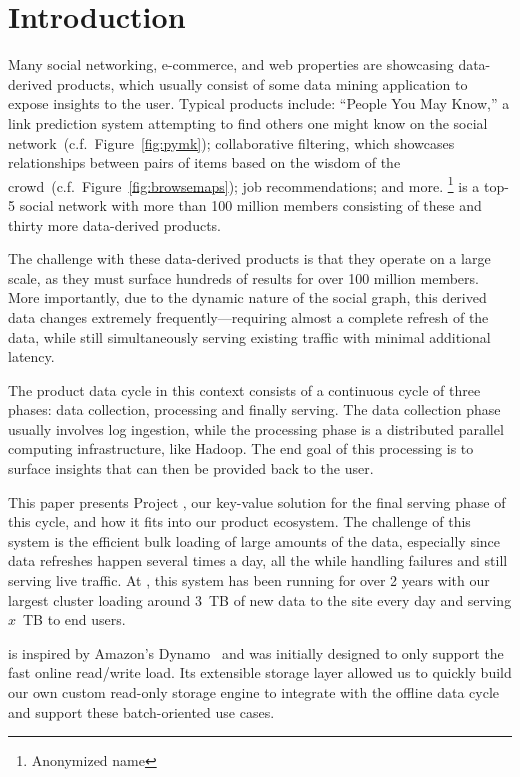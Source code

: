 \section{Introduction}
\label{sec:introduction}

Many social networking, e-commerce, and web properties are showcasing
data-derived products, which usually consist of some data mining
application to expose insights to the user. Typical products include:
``People You May Know,'' a link prediction system attempting to find
others one might know on the social
network~(c.f.~Figure~\ref{fig:pymk}); collaborative filtering, which
showcases relationships between pairs of items based on the wisdom of
the crowd~(c.f.~Figure~\ref{fig:browsemaps}); job recommendations; and
more. \linkedin\footnote{Anonymized name} is a top-5 social network
with more than 100 million members consisting of these and thirty more
data-derived products. 

The challenge with these data-derived products is that they operate on
a large scale, as they must surface hundreds of results for over 100
million members. More importantly, due to the dynamic nature of the
social graph, this derived data changes extremely
frequently---requiring almost a complete refresh of the data, while
still simultaneously serving existing traffic with minimal additional
latency.

The product data cycle in this context consists of a continuous cycle
of three phases: data collection, processing and finally serving. The
data collection phase usually involves log ingestion, while the
processing phase is a distributed parallel computing infrastructure,
like Hadoop. The end goal of this processing is to surface insights
that can then be provided back to the user. 

This paper presents Project \projectname{}, our key-value solution for
the final serving phase of this cycle, and how it fits into our
product ecosystem. The challenge of this system is the efficient bulk
loading of large amounts of the data, especially since data refreshes
happen several times a day, all the while handling failures and still
serving live traffic. At \linkedin, this system has been running for
over 2 years with our largest cluster loading around 3~TB of new data
to the site every day and serving $x$~TB to end users. 

\projectname{} is inspired by Amazon's Dynamo~\cite{dynamo} and was
initially designed to only support the fast online read/write load.
Its extensible storage layer allowed us to quickly build our own
custom read-only storage engine to integrate with the offline data
cycle and support these batch-oriented use cases.


